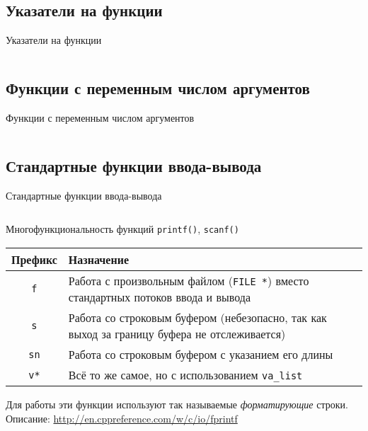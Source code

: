 \documentclass[handout]{beamer}
\begin{document}
\subsection{Указатели на функции}
\begin{frame}{Указатели на функции}
	\inputminted[linenos,bgcolor=listing,fontsize=\small]{C}{files/c_programming_langauge/funcptr.c}
\end{frame}

\subsection{Функции с переменным числом аргументов}
\begin{frame}{Функции с переменным числом аргументов}
	\inputminted[linenos,bgcolor=listing,fontsize=\small]{C}{files/c_programming_langauge/vararg.c}
\end{frame}

\subsection{Стандартные функции ввода-вывода}
\begin{frame}{Стандартные функции ввода-вывода}
	\inputminted[linenos,bgcolor=listing,fontsize=\small]{C}{files/c_programming_langauge/stdio.c}
\end{frame}

\begin{frame}{Многофункциональность функций \texttt{printf()}, \texttt{scanf()}}
	\begin{center}
		\begin{tabular}{|c|p{8cm}|}
			\hline
			Префикс & Назначение \\ \hline
			\texttt{f} & Работа с произвольным файлом (\texttt{FILE *}) вместо стандартных потоков ввода и вывода\\ \hline
			\texttt{s} & Работа со строковым буфером (небезопасно, так как выход за границу буфера не отслеживается) \\ \hline
			\texttt{sn} & Работа со строковым буфером с указанием его длины\\
			\hline
			\texttt{v*} & Всё то же самое, но с использованием \texttt{va\_list} \\ \hline
		\end{tabular}
	\end{center} \pause
	Для работы эти функции используют так называемые \emph{форматирующие} строки. Описание: {\color{blue}\url{http://en.cppreference.com/w/c/io/fprintf}}
\end{frame}
\end{document}
